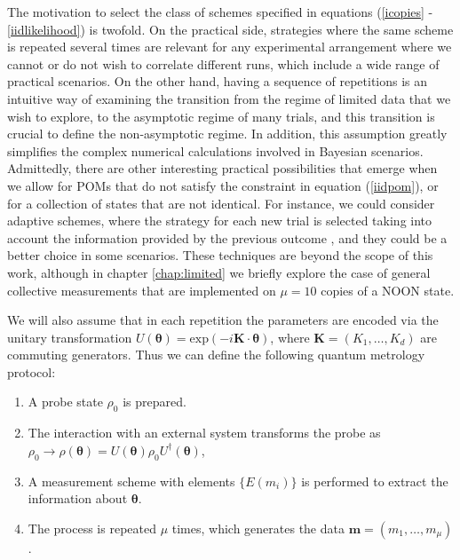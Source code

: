 The motivation to select the class of schemes specified in equations (\ref{icopies} - \ref{iidlikelihood}) is twofold. On the practical side, strategies where the same scheme is repeated several times are relevant for any experimental arrangement where we cannot or do not wish to correlate different runs, which include a wide range of practical scenarios. On the other hand, having a sequence of repetitions is an intuitive way of examining the transition from the regime of limited data that we wish to explore, to the asymptotic regime of many trials, and this transition is crucial to define the non-asymptotic regime. In addition, this assumption greatly simplifies the complex numerical calculations involved in Bayesian scenarios. Admittedly, there are other interesting practical possibilities that emerge when we allow for POMs that do not satisfy the constraint in equation (\ref{iidpom}), or for a collection of states that are not identical. For instance, we could consider adaptive schemes, where the strategy for each new trial is selected taking into account the information provided by the previous outcome \citep{berry2000, esteban2017, lumino2017}, and they could be a better choice in some scenarios. These techniques are beyond the scope of this work, although in chapter \ref{chap:limited} we briefly explore the case of general collective measurements \cite{kolodynski2014, jarzyna2016thesis} that are implemented on $\mu = 10$ copies of a NOON state.

We will also assume that in each repetition the parameters are encoded via the unitary transformation $U(\boldsymbol{\theta})=\mathrm{exp}(-i \boldsymbol{K}\cdot \boldsymbol{\theta})$, where $\boldsymbol{K} = (K_1, \dots, K_d)$ are commuting generators. Thus we can define the following quantum metrology protocol: 
\begin{enumerate}
\item A probe state $\rho_0$ is prepared.
\item The interaction with an external system transforms the probe as $\rho_0 \rightarrow \rho(\boldsymbol{\theta}) = U(\boldsymbol{\theta})\rho_0 U^\dagger(\boldsymbol{\theta})$,
\item A measurement scheme with elements $\lbrace E(m_i)\rbrace$ is performed to extract the information about $\boldsymbol{\theta}$.
\item The process is repeated $\mu$ times, which generates the data $\boldsymbol{m}=(m_1, \dots, m_\mu)$.
\end{enumerate}

